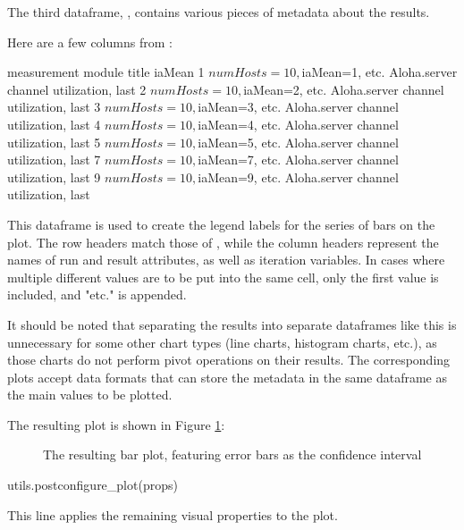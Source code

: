 The third dataframe, , contains various pieces of metadata about the results.

Here are a few columns from :

\begin{commandline}
                        measurement        module                      title
iaMean
1      $numHosts=10, $iaMean=1, etc.  Aloha.server  channel utilization, last
2      $numHosts=10, $iaMean=2, etc.  Aloha.server  channel utilization, last
3      $numHosts=10, $iaMean=3, etc.  Aloha.server  channel utilization, last
4      $numHosts=10, $iaMean=4, etc.  Aloha.server  channel utilization, last
5      $numHosts=10, $iaMean=5, etc.  Aloha.server  channel utilization, last
7      $numHosts=10, $iaMean=7, etc.  Aloha.server  channel utilization, last
9      $numHosts=10, $iaMean=9, etc.  Aloha.server  channel utilization, last
\end{commandline}

This dataframe is used to create the legend labels for the series of bars on the
plot. The row headers match those of , while the column headers
represent the names of run and result attributes, as well as iteration
variables. In cases where multiple different values are to be put into the same
cell, only the first value is included, and "etc." is appended.

It should be noted that separating the results into separate dataframes like
this is unnecessary for some other chart types (line charts, histogram charts,
etc.), as those charts do not perform pivot operations on their results. The
corresponding plots accept data formats that can store the metadata in the same
dataframe as the main values to be plotted.

The resulting plot is shown in Figure \ref{fig:ana-barplot}:

\begin{figure}[htbp]
  \begin{center}
    
    \caption{The resulting bar plot, featuring error bars as the confidence interval}
    \label{fig:ana-barplot}
  \end{center}
\end{figure}

\begin{python}
utils.postconfigure_plot(props)
\end{python}

This line applies the remaining visual properties to the plot.

